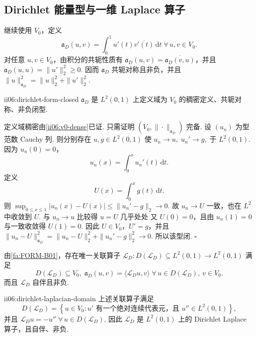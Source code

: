 \subsection{Dirichlet 能量型与一维 Laplace 算子}

继续使用 \(\displaystyle V_0\)，定义
\[
\mathfrak a_D(u,v)
=
\int_0^1u'(t)\overline{v'(t)}\,\mathrm{d}t
\;
\forall\,u,v\in V_0.
\]
对任意 \(\displaystyle u,v\in V_0\)，由积分的共轭性质有 \(\displaystyle\mathfrak a_D(u,v)=\overline{\mathfrak a_D(v,u)}\)，并且 \(\displaystyle\mathfrak a_D(u,u)=\|u'\|_2^2\geqslant0\). 因而 \(\displaystyle\mathfrak a_D\) 共轭对称且非负，并且
\(\displaystyle \|u\|_{\mathfrak a_D}^2 = \|u\|_2^2+\|u'\|_2^2.\)

\begin{FAProposition}{ii06:dirichlet-form-closed}
\(\displaystyle\mathfrak a_D\) 是 \(\displaystyle L^2(0,1)\) 上定义域为 \(\displaystyle V_0\) 的稠密定义、共轭对称、非负闭型.
\end{FAProposition}

\begin{FAProof}
定义域稠密由\autoref{ii06:v0-dense}已证. 只需证明 \(\displaystyle(V_0,\|\cdot\|_{\mathfrak a_D})\) 完备. 设 \(\displaystyle(u_n)\) 为型范数 Cauchy 列. 则分别存在 \(\displaystyle u,g\in L^2(0,1)\) 使
\(\displaystyle u_n\to u,\; u_n'\to g ,\;\text{于 }L^2(0,1).\)
因为 \(\displaystyle u_n(0)=0\)，
\[
u_n(x)=\int_0^x u_n'(t)\,\mathrm{d}t.
\]
定义
\[
U(x)=\int_0^x g(t)\,\mathrm{d}t.
\]
则
\(\displaystyle \sup_{0\leqslant x\leqslant1}|u_n(x)-U(x)| \leqslant \|u_n'-g\|_2 \longrightarrow0.\)
故 \(\displaystyle u_n\to U\) 一致，也在 \(\displaystyle L^2\) 中收敛到 \(\displaystyle U\). 与 \(\displaystyle u_n\to u\) 比较得 \(\displaystyle u=U\) 几乎处处 又 \(\displaystyle U(0)=0\)，且由 \(\displaystyle u_n(1)=0\) 与一致收敛得 \(\displaystyle U(1)=0\). 因此 \(\displaystyle U\in V_0\)，\(\displaystyle U'=g\)，并且
\(\displaystyle \|u_n-U\|_{\mathfrak a_D}^2 = \|u_n-U\|_2^2+\|u_n'-g\|_2^2 \longrightarrow0.\)
所以该型闭.
\hfill\(\square\)
\end{FAProof}

由\autoref{fa:FORM-B01}，存在唯一关联算子
\(\displaystyle \mathcal L_D:D(\mathcal L_D)\subseteq L^2(0,1)\to L^2(0,1)\)
满足
\[
D(\mathcal L_D)\subseteq V_0,
\;
\mathfrak a_D(u,v)
=
\langle\mathcal L_Du,v\rangle
\;
\forall\,u\in D(\mathcal L_D),\ v\in V_0.
\]
而且 \(\displaystyle\mathcal L_D\) 自伴且非负.

\begin{FATheorem}{ii06:dirichlet-laplacian-domain}
上述关联算子满足
\[
D(\mathcal L_D)
=
\left\{
 u\in V_0:
 u'\text{ 有一个绝对连续代表元，且 }u''\in L^2(0,1)
\right\},
\]
并且
\(\displaystyle \mathcal L_Du=-u'' \; \forall\,u\in D(\mathcal L_D).\)
因此 \(\displaystyle\mathcal L_D\) 是 \(\displaystyle L^2(0,1)\) 上的 Dirichlet Laplace 算子，且自伴、非负.
\end{FATheorem}


